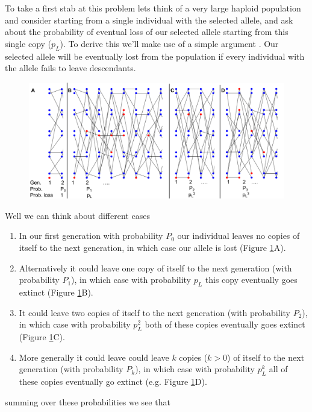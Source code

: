 To take a first stab at this problem lets think of a very large
haploid population and consider starting from a single individual with the selected allele, and ask
about the probability of eventual loss of our selected allele starting
from this single copy ($p_L$). To derive this we'll make use of a
simple argument \citep[derived from branching processes][]{fisher1923xxi,haldane1927mathematical}. Our selected
allele will be eventually lost from the population if every individual
with the allele fails to leave descendants.
\begin{figure}
\begin{center}
\includegraphics[width=0.9 \textwidth]{figures/Proof_of_pL_2s.pdf}
\end{center}
\caption{} \label{fig:Proof_of_pL_2s}
\end{figure}
Well we can think about different cases 
\begin{enumerate}
\item In our first generation
with probability $P_0$ our individual leaves no copies of itself to
the next generation, in which case our allele is lost (Figure \ref{fig:Proof_of_pL_2s}A).
\item Alternatively
it could leave one copy of itself to the next generation (with
probability $P_1$), in which
case with probability $p_L$ this copy eventually goes extinct (Figure \ref{fig:Proof_of_pL_2s}B).
\item It could leave two copies of itself to the next generation (with
probability $P_2$), in which
case with probability $p_L^2$ both of these copies eventually goes
extinct (Figure \ref{fig:Proof_of_pL_2s}C).
\item More generally it could leave could leave $k$ copies ($k>0$) of itself to the next generation (with
probability $P_k$), in which case with probability $p_L^k$  all of
these copies eventually go extinct (e.g. Figure \ref{fig:Proof_of_pL_2s}D).
\end{enumerate}
summing over these probabilities we see that
